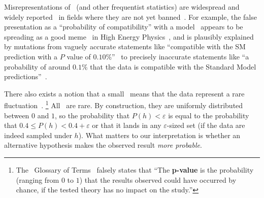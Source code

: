 Misrepresentations of \pvalues\ (and other frequentist statistics) are
widespread and widely reported~\cite{
schervish1996p,
Cohen1994TheEI,
Amrhein2017TheEI,
goodman2008dirty,
greenland2016no,
Bernstein2016princess,
wagenmakers2007practical,
hauer2004harm,
wasserstein2016asa
}
in fields where they are not yet banned~\cite{
Trafimow2015ban,
woolston2015phychology,
chumra2019time,
shrout1997should,
hunter1997needed
}.
For example, the false presentation as a ``probability of compatibility'' with
a model~\cite{HIGG-2018-04} appears to be spreading as a good
meme~\cite{dawkins1989selfish} in High Energy Physics~\cite{
roth2007fit,
HIGG-2017-09,
HIGG-2018-27,
HIGG-2018-51,
HIGG-2019-14,
EXOT-2016-36,
EXOT-2018-08,
EXOT-2019-15,
HION-2018-19,
chan2019search,
mastrandrea2019searches,
white2019search,
langford2021combination,
IceCube2013search,
IceCube2014searches,
gerasimov2021new
},
and is plausibly explained by mutations from vaguely accurate statements like
``compatible with the SM prediction with a $P$ value of $0.10\%$''~\cite{
lhcb2021test
}
to precisely inaccurate statements like
``a probability of around $0.1\%$ that the data is compatible with the
Standard Model predictions''~\cite{cern2021test}.

There also exists a notion that a small \pvalue\ means that the data
represent a rare fluctuation~\cite{murray1997use, atlas2022glossary}.%
\footnote{%
The \atlas\ Glossary of Terms~\cite{atlas2022glossary} falsely states that
``The \textbf{p-value} is the probability (ranging from $0$ to $1$) that the
results observed could have occurred by chance, if the tested theory has no
impact on the study.''%
}
All \pvalues\ are rare.
By construction, they are uniformly distributed between $0$ and $1$, so the
probability that $P(h) < \varepsilon$ is equal to the probability that
$0.4 \leq P(h) < 0.4 + \varepsilon$ or that it lands in any
$\varepsilon$-sized set
(if the data are indeed sampled under $h$).
What matters to our interpretation is whether an alternative hypothesis
makes the observed result \emph{more probable}.

